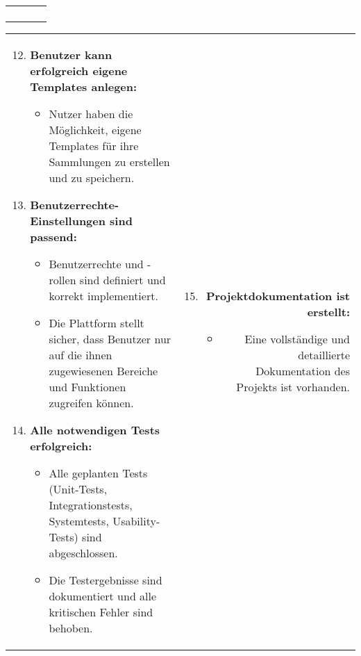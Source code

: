\begin{tabularx}{\textwidth}{L R}
\begin{enumerate}[left=0pt,label=\arabic*.,itemsep=0.4cm]
        \end{enumerate}
    \end{tabularx}

    \newpage
    \vspace{0.5cm}
    \begin{tabularx}{\textwidth}{L R}
        \begin{enumerate}[left=0pt,label=\arabic*.,itemsep=0.4cm]
            \setcounter{enumi}{11}
            \small
            \item \textbf{Benutzer kann erfolgreich eigene Templates anlegen:}
            \begin{itemize}[label=--]
                \item Nutzer haben die Möglichkeit, eigene Templates für ihre Sammlungen zu erstellen und zu speichern.
            \end{itemize}

            \item \textbf{Benutzerrechte-Einstellungen sind passend:}
            \begin{itemize}[label=--]
                \item Benutzerrechte und -rollen sind definiert und korrekt implementiert.
                \item Die Plattform stellt sicher, dass Benutzer nur auf die ihnen zugewiesenen Bereiche und Funktionen zugreifen können.
            \end{itemize}

            \item \textbf{Alle notwendigen Tests erfolgreich:}
            \begin{itemize}[label=--]
                \item Alle geplanten Tests (Unit-Tests, Integrationstests, Systemtests, Usability-Tests) sind abgeschlossen.
                \item Die Testergebnisse sind dokumentiert und alle kritischen Fehler sind behoben.
            \end{itemize}

        \end{enumerate}
        &
        \begin{enumerate}[left=0pt,label=\arabic*.,itemsep=0.4cm]
            \setcounter{enumi}{14}
            \small
            \item \textbf{Projektdokumentation ist erstellt:}
            \begin{itemize}[label=--]
                \item Eine vollständige und detaillierte Dokumentation des Projekts ist vorhanden.
            \end{itemize}


\end{enumerate}
\end{tabularx}
